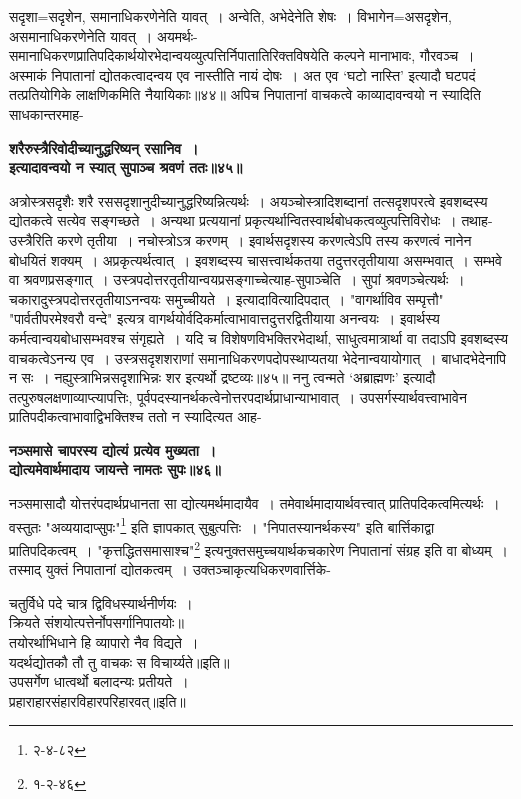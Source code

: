 {{{{ सदृशा=सदृशेन, समानाधिकरणेनेति यावत्~।
अन्वेति, अभेदेनेति शेषः~।
विभागेन=असदृशेन, असमानाधिकरणेनेति यावत्~।
 अयमर्थः-समानाधिकरणप्रातिपदिकार्थयोरभेदान्वयव्युत्पत्तिर्निपातातिरिक्तविषयेति कल्पने मानाभावः, गौरवञ्च~।
अस्माकं निपातानां द्योतकत्वादन्वय एव नास्तीति नायं दोषः~।
अत एव `घटो नास्ति' इत्यादौ घटपदं तत्प्रतियोगिके लाक्षणिकमिति नैयायिकाः॥४४॥
 अपिच निपातानां वाचकत्वे काव्यादावन्वयो न स्यादिति साधकान्तरमाह-

 \begin{center}{\bfseries शरैरुस्त्रैरिवोदीच्यानुद्धरिष्यन् रसानिव~।\\
 इत्यादावन्वयो न स्यात् सुपाञ्च श्रवणं ततः॥४५॥}\end{center}

 अत्रोस्त्रसदृशैः शरै रससदृशानुदीच्यानुद्धरिष्यन्नित्यर्थः~।
अयञ्चोस्त्रादिशब्दानां तत्सदृशपरत्वे इवशब्दस्य द्योतकत्वे सत्येव सङ्गच्छते~।
अन्यथा प्रत्ययानां प्रकृत्यर्थान्वितस्वार्थबोधकत्वव्युत्पत्तिविरोधः~।
 तथाह-उस्त्रैरिति करणे तृतीया~।
नचोस्त्रोऽत्र करणम्~।
इवार्थसदृशस्य करणत्वेऽपि तस्य करणत्वं नानेन बोधयितं शक्यम्~।
अप्रकृत्यर्थत्वात्~।
इवशब्दस्य चासत्त्वार्थकतया तदुत्तरतृतीयाया असम्भवात्~।
सम्भवे वा श्रवणप्रसङ्गात्~।
उस्त्रपदोत्तरतृतीयान्वयप्रसङ्गाच्चेत्याह-सुपाञ्चेति~।
सुपां श्रवणञ्चेत्यर्थः~।
चकारादुस्त्रपदोत्तरतृतीयाऽनन्वयः समुच्चीयते~।
 इत्यादावित्यादिपदात्~।
"वागर्थाविव सम्पृत्तौ" "पार्वतीपरमेश्वरौ वन्दे" इत्यत्र वागर्थयोर्वदिकर्मात्वाभावात्तदुत्तरद्वितीयाया अनन्वयः~।
इवार्थस्य कर्मत्वान्वयबोधासम्भवश्च संगृह्यते~।
 यदि च विशेषणविभक्तिरभेदार्था, साधुत्वमात्रार्था वा तदाऽपि इवशब्दस्य वाचकत्वेऽनन्य एव~।
उस्त्रसदृशशराणां समानाधिकरणपदोपस्थाप्यतया भेदेनान्वयायोगात्~।
बाधादभेदेनापि न सः~।
नह्युस्त्राभिन्नसदृशाभिन्नः शर इत्यर्थो द्रष्टव्यः॥४५॥
 ननु त्वन्मते `अब्राह्मणः' इत्यादौ तत्पुरुषलक्षणाव्याप्त्यापत्तिः, पूर्वपदस्यानर्थकत्वेनोत्तरपदार्थप्राधान्याभावात्~।
उपसर्गस्यार्थवत्त्वाभावेन प्रातिपदीकत्वाभावाद्विभक्तिश्च ततो न स्यादित्यत आह-
 \begin{center}{\bfseries नञ्समासे चापरस्य द्योत्यं प्रत्येव मुख्यता~।\\
 द्योत्यमेवार्थमादाय जायन्ते नामतः सुपः॥४६॥}\end{center}

 नञ्समासादौ योत्तरंपदार्थप्रधानता सा द्योत्यमर्थमादायैव~।
तमेवार्थमादायार्थवत्त्वात् प्रातिपदिकत्वमित्यर्थः~।
 वस्तुतः "अव्ययादाप्सुपः"\footnote{२-४-८२} इति ज्ञापकात् सुबुत्पत्तिः~।
"निपातस्यानर्थकस्य" इति बार्त्तिकाद्वा प्रातिपदिकत्वम्~।
"कृत्तद्धितसमासाश्च"\footnote{१-२-४६} इत्यनुक्तसमुच्चयार्थकचकारेण निपातानां संग्रह इति वा बोध्यम्~।
तस्माद् युक्तं निपातानां द्योतकत्वम्~।
उक्तञ्चाकृत्यधिकरणवार्त्तिके-
\begin{center} चतुर्विधे पदे चात्र द्विविधस्यार्थनीर्णयः~।\\
 क्रियते संशयोत्पत्तेर्नोपसर्गानिपातयोः॥\\[10pt]
 तयोरर्थाभिधाने हि व्यापारो नैव विद्यते~।\\
 यदर्थद्योतकौ तौ तु वाचकः स विचार्य्यते॥इति॥\\[10pt]
 उपसर्गेण धात्वर्थो बलादन्यः प्रतीयते~।\\
 प्रहाराहारसंहारविहारपरिहारवत्॥इति॥\end{center}

}}}}
